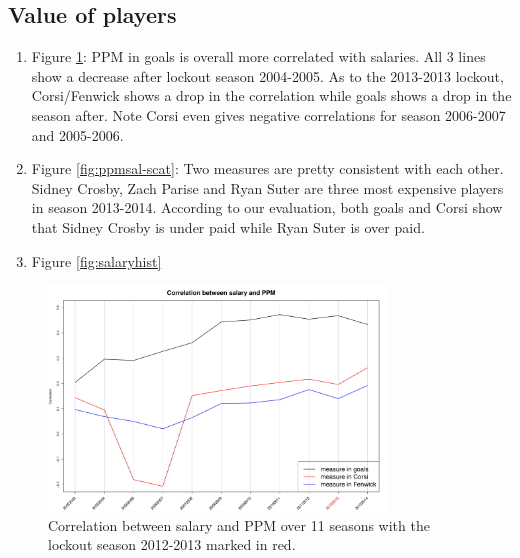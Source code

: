 \subsection{Value of players}

\begin{enumerate}
    \item Figure \ref{fig:ppmsal-corr-season}: PPM in goals is overall more correlated with salaries. All 3 lines show a decrease after lockout season 2004-2005. As to the 2013-2013 lockout, Corsi/Fenwick shows a drop in the correlation while goals shows a drop in the season after. Note Corsi even gives negative correlations for season 2006-2007 and 2005-2006. 
    \item Figure \ref{fig:ppmsal-scat}: Two measures are pretty consistent with each other. Sidney Crosby, Zach Parise and Ryan Suter are three most expensive players in season 2013-2014. According to our evaluation, both goals and Corsi show that Sidney Crosby is under paid while Ryan Suter is over paid. 
    \item Figure \ref{fig:salaryhist}
\end{enumerate}

\begin{figure}[htb!]
    \centering
    \includegraphics[width=0.8\textwidth]{figures/ppmsal-corr-season.pdf}
    \caption{Correlation between salary and PPM over 11 seasons with the lockout season 2012-2013 marked in red.}\label{fig:ppmsal-corr-season}
\end{figure}

